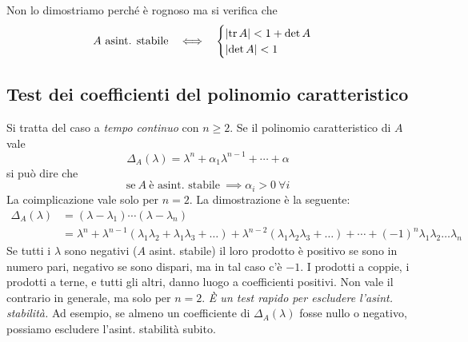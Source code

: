 Non lo dimostriamo perché è rognoso ma si verifica che
\begin{equation*}
	A\ \text{asint. stabile} \ \ \iff \ \ \begin{cases}
	\left| \tr A\right| < 1+\det A\\
	\left| \det A\right| < 1
	\end{cases}
\end{equation*}

\subsection{Test dei coefficienti del polinomio caratteristico}

Si tratta del caso a \textit{tempo continuo} con $n\geq 2$. Se il polinomio caratteristico di $A$ vale
\begin{equation*}
	\Delta _A\left(\lambda \right) =\lambda ^n +\alpha _1 \lambda ^{n-1} +\cdots +\alpha 
\end{equation*}
si può dire che
\begin{equation*}
	\boxed{\text{se} \ A\ \text{è asint. stabile} \ \implies \alpha _i  >0\ \forall i}
\end{equation*}
La coimplicazione vale solo per $n=2$. La dimostrazione è la seguente:
\begin{equation*}
	\begin{aligned}
		\Delta _A\left(\lambda \right) & =\left(\lambda -\lambda _1\right) \cdots \left(\lambda -\lambda _n\right)                                                                                                                                                              \\
		                               & =\lambda ^n +\lambda ^{n-1}\left(\lambda _1 \lambda _2 +\lambda _1 \lambda _3 +\dotsc \right) +\lambda ^{n-2}\left(\lambda _1 \lambda _2 \lambda _3 +\dotsc \right) +\cdots +\left(-1\right)^n \lambda _1 \lambda _2 \dotsc \lambda _n 
	\end{aligned}
\end{equation*}
Se tutti i $\lambda $ sono negativi ($A$ asint. stabile) il loro prodotto è positivo se sono in numero pari, negativo se sono dispari, ma in tal caso c'è $-1$. I prodotti a coppie, i prodotti a terne, e tutti gli altri, danno luogo a coefficienti positivi. Non vale il contrario in generale, ma solo per $n=2$. \textit{È un test rapido per escludere l'asint. stabilità.} Ad esempio, se almeno un coefficiente di $\Delta _A\left(\lambda \right)$ fosse nullo o negativo, possiamo escludere l'asint. stabilità subito.

